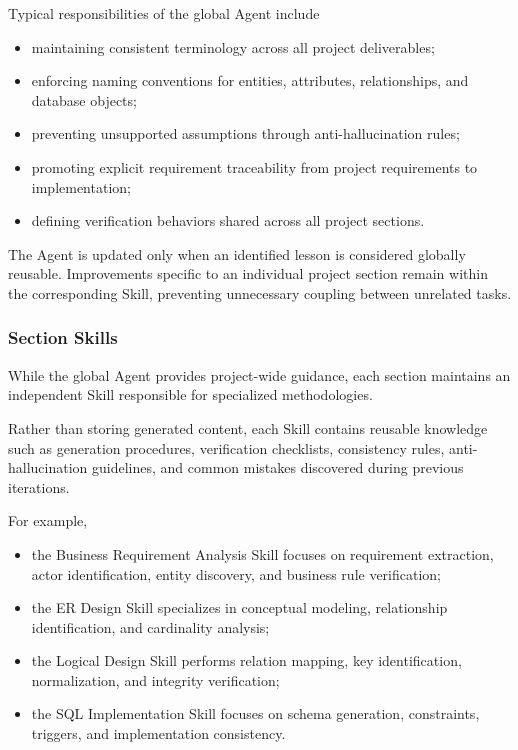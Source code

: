 Typical responsibilities of the global Agent include

\begin{itemize}

	\item maintaining consistent terminology across all project deliverables;

	\item enforcing naming conventions for entities, attributes, relationships, and database objects;

	\item preventing unsupported assumptions through anti-hallucination rules;

	\item promoting explicit requirement traceability from project requirements to implementation;

	\item defining verification behaviors shared across all project sections.

\end{itemize}

The Agent is updated only when an identified lesson is considered globally reusable. Improvements specific to an individual project section remain within the corresponding Skill, preventing unnecessary coupling between unrelated tasks.

\subsubsection{Section Skills}

While the global Agent provides project-wide guidance, each section maintains an independent Skill responsible for specialized methodologies.

Rather than storing generated content, each Skill contains reusable knowledge such as generation procedures, verification checklists, consistency rules, anti-hallucination guidelines, and common mistakes discovered during previous iterations.

For example,

\begin{itemize}

	\item the Business Requirement Analysis Skill focuses on requirement extraction, actor identification, entity discovery, and business rule verification;

	\item the ER Design Skill specializes in conceptual modeling, relationship identification, and cardinality analysis;

	\item the Logical Design Skill performs relation mapping, key identification, normalization, and integrity verification;

	\item the SQL Implementation Skill focuses on schema generation, constraints, triggers, and implementation consistency.

\end{itemize}

